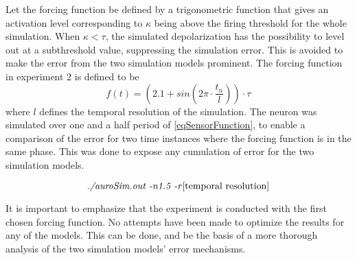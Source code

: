 	Let the forcing function be defined by a trigonometric function that gives an activation level corresponding to $\kappa$ being above the firing threshold for the whole simulation.
	When $\kappa < \tau$, the simulated depolarization has the possibility to level out at a subthreshold value, suppressing the simulation error. 
	This is avoided to make the error from the two simulation models prominent. %
	The forcing function in experiment 2 is defined to be
\begin{equation}
	f(t) = (2.1 + sin\left(2\pi \cdot \frac{t_n}{l}\right)) \cdot \tau %
	\label{eqSensorFunction}
\end{equation}
	where $l$ defines the temporal resolution of the simulation.
	The neuron was simulated over one and a half period of \eqref{eqSensorFunction}, to enable a comparison of the error for two time instances where the forcing function is in the same phase.
	This was done to expose any cumulation of error for the two simulation models. %
	
\begin{equation}
	\text{\emph{./auroSim.out -n1.5 -r\emph{[temporal resolution]}}}
	\nonumber
\end{equation}


 	It is important to emphasize that the experiment is conducted with the first chosen forcing function.
	No attempts have been made to optimize the results for any of the models.
	This can be done, and be the basis of a more thorough analysis of the two simulation models' error mechanisms.

